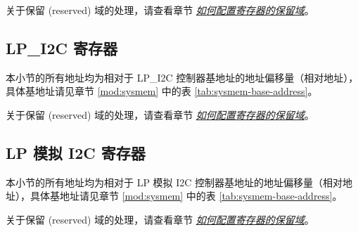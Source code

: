 \documentclass[main\_\_CN.tex]{subfiles}
\begin{document}
关于保留 (reserved) 域的处理，请查看章节 \hyperref[programming-reserved-field]{\textit{如何配置寄存器的保留域}}。



\subsection{LP\_I2C 寄存器}

本小节的所有地址均为相对于 LP\_I2C 控制器基地址的地址偏移量（相对地址），具体基地址请见章节 \ref{mod:sysmem} \textit{} 中的表 \ref{tab:sysmem-base-address}。

关于保留 (reserved) 域的处理，请查看章节 \hyperref[programming-reserved-field]{\textit{如何配置寄存器的保留域}}。



\subsection{LP 模拟 I2C 寄存器}

本小节的所有地址均为相对于 LP 模拟 I2C 控制器基地址的地址偏移量（相对地址），具体基地址请见章节 \ref{mod:sysmem} \textit{} 中的表 \ref{tab:sysmem-base-address}。

关于保留 (reserved) 域的处理，请查看章节 \hyperref[programming-reserved-field]{\textit{如何配置寄存器的保留域}}。


\end{document}

